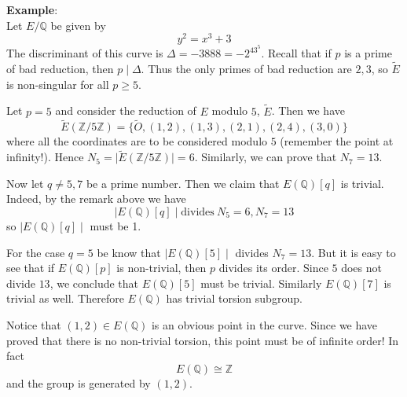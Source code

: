 \documentclass[12pt]{article}
\newcommand{\Ints}{\mathbb{Z}}
\newcommand{\Rats}{\mathbb{Q}}
\begin{document}
{\bf Example}:\quad\\ Let $E/\Rats$ be given by $$ y^2=x^3+3$$ The
discriminant of this curve is $\Delta=-3888=-2^43^5$. Recall that
if $p$ is a prime of bad reduction, then $p\mid \Delta$. Thus the
only primes of bad reduction are $2,3$, so $\widetilde{E}$ is
non-singular for all $p\geq 5$.

Let $p=5$ and consider the reduction of $E$ modulo $5$,
$\widetilde{E}$. Then we have
$$\widetilde{E}(\Ints/5\Ints)=\{ \widetilde{O}, (1,2), (1,3),
(2,1), (2,4),(3,0) \}$$ where all the coordinates are to be
considered modulo $5$ (remember the point at infinity!). Hence
$N_5=\mid \widetilde{E}(\Ints/5\Ints)\mid=6$. Similarly, we can
prove that $N_7=13$.

Now let $q\neq 5,7$ be a prime number. Then we claim that
$E(\Rats)[q]$ is trivial. Indeed, by the remark above we have
$$\mid E(\Rats)[q] \mid \text{divides}\ N_5=6,N_7=13$$
so $\mid E(\Rats)[q] \mid$ must be 1.

For the case $q=5$ be know that $\mid E(\Rats)[5] \mid$ divides
$N_7=13$. But it is easy to see that if $E(\Rats)[p]$ is
non-trivial, then $p$ divides its order. Since $5$ does not divide
$13$, we conclude that $E(\Rats)[5]$ must be trivial. Similarly
$E(\Rats)[7]$ is trivial as well. Therefore $E(\Rats)$ has trivial
torsion subgroup.

Notice that $(1,2)\in E(\Rats)$ is an obvious point in the curve.
Since we have proved that there is no non-trivial torsion, this
point must be of infinite order! In fact
$$E(\Rats)\cong \Ints$$
and the group is generated by $(1,2)$.
\end{document}
